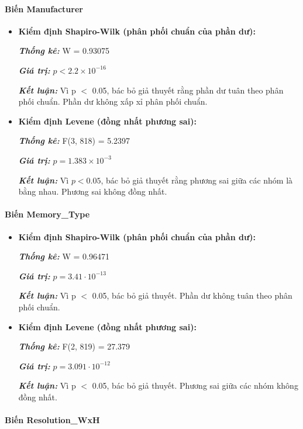 \paragraph{Biến Manufacturer}
\begin{itemize}
    \item \textbf{Kiểm định Shapiro-Wilk (phân phối chuẩn của phần dư):}
    
    \textbf{\textit{Thống kê:}} W = 0.93075
    
    \textbf{\textit{Giá trị:}} $p<2.2 \times10^{-16} $
    
    \textbf{\textit{Kết luận:}} Vì p $<$ 0.05, bác bỏ giả thuyết rằng phần dư tuân theo phân phối chuẩn. Phần dư không xấp xỉ phân phối chuẩn.
    \item \textbf{Kiểm định Levene (đồng nhất phương sai):}
    
    \textit{\textbf{Thống kê:}} F(3, 818) = 5.2397

   \textit{\textbf{Giá trị:}} $p = 1.383 \times10^{-3} $
    
   \textit{\textbf{Kết luận:}} Vì $p < 0.05$, bác bỏ giả thuyết rằng phương sai giữa các nhóm là bằng nhau. Phương sai không đồng nhất.
\end{itemize}

\paragraph{Biến Memory\_Type}
\begin{itemize}
    \item \textbf{Kiểm định Shapiro-Wilk (phân phối chuẩn của phần dư):}
    
    \textbf{\textit{Thống kê:}} W = 0.96471

    \textbf{\textit{Giá trị:}} $p=3.41\cdot{10}^{-13}$
    
    \textbf{\textit{Kết luận:}} Vì p $<$ 0.05, bác bỏ giả thuyết. Phần dư không tuân theo phân phối chuẩn.
    \item \textbf{Kiểm định Levene (đồng nhất phương sai):}
    
    \textbf{\textit{Thống kê:}} F(2, 819) = 27.379
    
   \textbf{\textit{Giá trị:}} $p=3.091\cdot{10}^{-12}$
    
    \textbf{\textit{Kết luận:}} Vì p $<$ 0.05, bác bỏ giả thuyết. Phương sai giữa các nhóm không đồng nhất.
\end{itemize}

\paragraph{Biến Resolution\_WxH}

